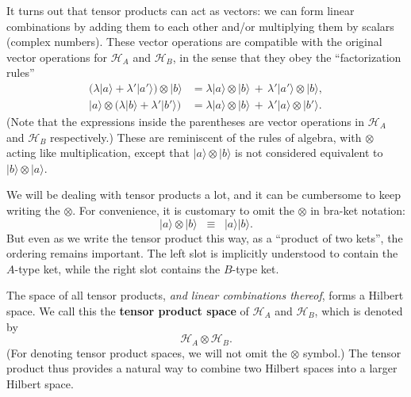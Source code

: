 \documentclass[prx,12pt]{revtex4-2}
\begin{document}
It turns out that tensor products can act as vectors: we can form
linear combinations by adding them to each other and/or multiplying
them by scalars (complex numbers).  These vector operations are
compatible with the original vector operations for $\mathscr{H}_A$ and
$\mathscr{H}_B$, in the sense that they obey the ``factorization
rules''
\begin{align}
  \Big(\lambda |a\rangle
  + \lambda' |a'\rangle\Big) \otimes |b\rangle &=
  \lambda |a\rangle \otimes |b\rangle \,+\,
  \lambda' |a'\rangle \otimes |b\rangle, \label{tensorrule1} \\
  |a\rangle \otimes \Big(\lambda |b\rangle
  + \lambda' |b'\rangle\Big) &=
  \lambda |a\rangle \otimes |b\rangle \,+\,
  \lambda' |a\rangle \otimes |b'\rangle.
  \label{tensorrule2} 
\end{align}
(Note that the expressions inside the parentheses are vector
operations in $\mathscr{H}_A$ and $\mathscr{H}_B$ respectively.)
These are reminiscent of the rules of algebra, with $\otimes$ acting
like multiplication, except that $|a\rangle\otimes|b\rangle$ is not
considered equivalent to $|b\rangle\otimes|a\rangle$.

We will be dealing with tensor products a lot, and it can be
cumbersome to keep writing the $\otimes$.  For convenience, it is
customary to omit the $\otimes$ in bra-ket notation:
\begin{equation}
  |a \rangle \otimes |b\rangle \;\; \equiv \;\; |a \rangle |b\rangle.
\end{equation}
But even as we write the tensor product this way, as a ``product of
two kets'', the ordering remains important.  The left slot is
implicitly understood to contain the $A$-type ket, while the right
slot contains the $B$-type ket.

The space of all tensor products, \textit{and linear combinations
  thereof}, forms a Hilbert space.  We call this the \textbf{tensor
  product space} of $\mathscr{H}_A$ and $\mathscr{H}_B$, which is
denoted by
\begin{equation*}
  \mathscr{H}_A\otimes \mathscr{H}_B.
\end{equation*}
(For denoting tensor product spaces, we will not omit the $\otimes$
symbol.)  The tensor product thus provides a natural way to combine
two Hilbert spaces into a larger Hilbert space.
\end{document}
